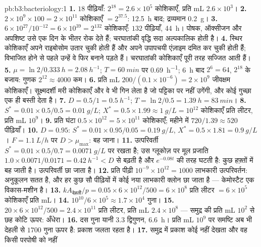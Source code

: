 \begin{solution}{pb:b3:bacteriology:1}
\textbf{1.} $18$ पीढ़ियाँ: $2^{18} = 2.6\times 10^{5}$ कोशिकाएँ,
प्रति mL $2.6\times 10^{3}$।
\textbf{2.} $2\times 10^{9}\times 100 = 2\times 10^{11}$ कोशिकाएँ $=
2^{37.5}$: \qty{12.5}{h} बाद; द्रव्यमान \qty{0.2}{g}।
\textbf{3.} $6\times 10^{27}/10^{-12} = 6\times 10^{39} = 2^{132}$ कोशिकाएँ:
$132$ पीढ़ियाँ, \qty{44}{h}। पोषक, ऑक्सीजन और अपशिष्ट उसे एक दिन के
भीतर रोक देते हैं; चरघातांकी वृद्धि सदा अल्पकालिक होती है।
\textbf{4.} स्थिर कोशिकाएँ अपने राइबोसोम उतार चुकी होती हैं और अपने
उपापचयी एंज़ाइम दमित कर चुकी होती हैं; विभाजित होने से पहले उन्हें वे
फिर बनाने पड़ते हैं। चरघातांकी कोशिकाएँ पूरी तरह सज्जित आती हैं।
\textbf{5.} $\mu = \ln 2/\qty{0.333}{h} = \qty{2.08}{h^{-1}}$; $T =
\qty{60}{min}$ पर \qty{0.69}{h^{-1}}; \qty{6}{h} बाद $2^{6} = 64$,
$2^{18}$ के बजाय: गुणक $2^{12} \approx 4000$ कम।
\textbf{6.} प्रति mL $200/(0.1\times 10^{-6}) = 2\times 10^{9}$ जीवक्षम
कोशिकाएँ। सूक्ष्मदर्शी मरी कोशिकाएँ और वे भी गिन लेता है जो पट्टिका पर
नहीं उगेंगी, और कोई गुच्छा एक ही बस्ती देता है।
\textbf{7.} $D = 0.5/1 = \qty{0.5}{h^{-1}}$; $T = \ln 2/0.5 =
\qty{1.39}{h} = \qty{83}{min}$।
\textbf{8.} $S^{*} = 0.01\times 0.5/0.5 = \qty{0.01}{g/L}$; $X^{*} =
0.5\times 1.99 \approx \qty{1}{g/L} = 10^{12}$ कोशिकाएँ प्रति लीटर,
प्रति mL $10^{9}$।
\textbf{9.} प्रति घंटा $0.5\times 10^{12} = 5\times 10^{11}$ कोशिकाएँ;
महीने में $720/1.39
\approx 520$ पीढ़ियाँ।
\textbf{10.} $D = 0.95$: $S^{*} = 0.01\times 0.95/0.05 = \qty{0.19}{g/L}$,
$X^{*} = 0.5\times 1.81 = \qty{0.9}{g/L}$। $F = \qty{1.1}{L/h}$ पर $D
> \mu_{\max}$: बह जाना।
\textbf{11.} उत्परिवर्ती $S^{*} = 0.01\times 0.5/0.7 = \qty{0.0071}{g/L}$
पर रखता है; उस ग्लूकोज़ पर मूल प्रजाति $1.0\times 0.0071/0.0171 =
\qty{0.42}{h^{-1}} < D$ से बढ़ती है और $e^{-0.08t}$ की तरह घटती है: कुछ
हफ़्तों में बह जाती है। उत्परिवर्ती छा जाता है।
\textbf{12.} प्रति पीढ़ी $10^{-9}\times 10^{12} = 1000$ लाभकारी
उत्परिवर्तन: अनुकूलन सतत है, और हर कुछ सौ पीढ़ियों में कोई नया लाभकारी
क्लोन छा जाता है --- केमोस्टैट एक विकास-मशीन है।
\textbf{13.} $kA_{\text{देहली}}/p = 0.05\times 6\times 10^{12}/500 =
6\times 10^{8}$ प्रति लीटर $= 6\times 10^{5}$ कोशिकाएँ प्रति mL।
\textbf{14.} $10^{10}/6\times 10^{5} \approx 1.7\times 10^{4}$ गुना।
\textbf{15.} $20\times 6\times 10^{12}/500 = 2.4\times 10^{11}$ प्रति लीटर,
प्रति mL $2.4\times 10^{8}$ --- समुद्र की प्रति mL $10^{2}$ से छह कोटि
ऊपर: अँधेरा।
\textbf{16.} दस गुना यानी $3.3$ द्विगुणन, \qty{6.6}{h}। प्रति mL $10^{9}$
पर समष्टि अब भी देहली से $1700$ गुना ऊपर है: प्रकाश जलता रहता है।
\textbf{17.} समुद्र में प्रकाश कोई नहीं देखता और वह किसी परपोषी को नहीं

\end{solution}
